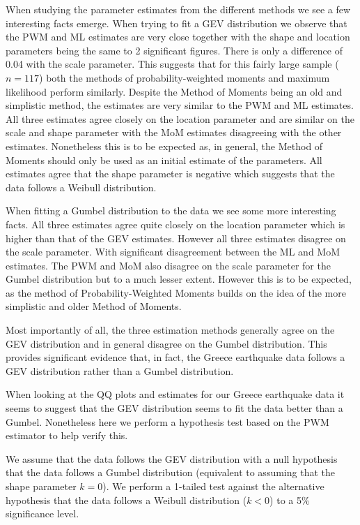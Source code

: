 \documentclass{article}
\begin{document}

When studying the parameter estimates from the different methods we see a few interesting facts emerge. When trying to fit a GEV distribution we observe that the PWM and ML estimates are very close together with the shape and location parameters being the same to 2 significant figures. There is only a difference of 0.04 with the scale parameter. This suggests that for this fairly large sample ($n=117$) both the methods of probability-weighted moments and maximum likelihood perform similarly. Despite the Method of Moments being an old and simplistic method, the estimates are very similar to the PWM and ML estimates. All three estimates agree closely on the location parameter and are similar on the scale and shape parameter with the MoM estimates disagreeing with the other estimates. Nonetheless this is to be expected as, in general, the Method of Moments should only be used as an initial estimate of the parameters. All estimates agree that the shape parameter is negative which suggests that the data follows a Weibull distribution.

When fitting a Gumbel distribution to the data we see some more interesting facts. All three estimates agree quite closely on the location parameter which is higher than that of the GEV estimates. However all three estimates disagree on the scale parameter. With significant disagreement between the ML and MoM estimates. The PWM and MoM also disagree on the scale parameter for the Gumbel distribution but to a much lesser extent. However this is to be expected, as the method of Probability-Weighted Moments builds on the idea of the more simplistic and older Method of Moments.

Most importantly of all, the three estimation methods generally agree on the GEV distribution and in general disagree on the Gumbel distribution. This provides significant evidence that, in fact, the Greece earthquake data follows a GEV distribution rather than a Gumbel distribution. 

When looking at the QQ plots and estimates for our Greece earthquake data it seems to suggest that the GEV distribution seems to fit the data better than a Gumbel. Nonetheless here we perform a hypothesis test based on the PWM estimator to help verify this.

We assume that the data follows the GEV distribution with a null hypothesis that the data follows a Gumbel distribution (equivalent to assuming that the shape parameter $k=0$). We perform a 1-tailed test against the alternative hypothesis that the data follows a Weibull distribution ($k < 0$) to a 5\% significance level.
\end{document}
